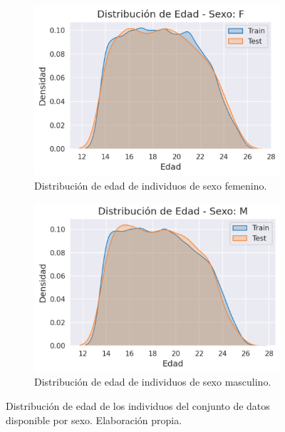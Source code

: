 \begin{figure}[h]
        \centering

        \begin{subfigure}[b]{0.47\textwidth}
            \centering
            \includegraphics[width=\textwidth]{capitulos/cap_04/imagenes/kde_ages_F.png}
            \caption{Distribución de edad de individuos de sexo femenino.}
            \label{fig:kde_ages_F}
        \end{subfigure}
        \hfill
        \begin{subfigure}[b]{0.47\textwidth}
            \centering
            \includegraphics[width=\textwidth]{capitulos/cap_04/imagenes/kde_ages_M.png}
            \caption{Distribución de edad de individuos de sexo masculino.}
            \label{fig:kde_ages_M}
        \end{subfigure}

        \caption[
            Distribución de edad de los individuos del conjunto de datos disponible por sexo.
        ]{
            Distribución de edad de los individuos del conjunto de datos disponible por sexo. 
            Elaboración propia.
        }
        \label{fig:kde_ages_train_test}
    \end{figure}


